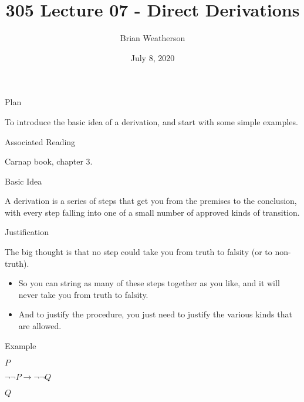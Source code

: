 \documentclass[
  ignorenonframetext,
]{beamer}
\title{305 Lecture 07 - Direct Derivations}
\author{Brian Weatherson}
\date{July 8, 2020}
\providecommand{\tightlist}{%
  \setlength{\itemsep}{0pt}\setlength{\parskip}{0pt}}
\renewcommand{\,}{\text{, }}
\renewenvironment*{quote}	
	{\list{}{\rightmargin   \leftmargin} \item } 	
	{\endlist }
\newcommand{\DisplayArg}[2]{
\begin{enumerate}
{#1}
\end{enumerate}
\vspace{-6pt}
\hrulefill

\begin{quote}
{\normalfont #2}
\end{quote}
\vspace{12pt}
}
\begin{document}
\frame{\titlepage}

\begin{frame}{Plan}
\protect\hypertarget{plan}{}

To introduce the basic idea of a derivation, and start with some simple
examples.

\end{frame}

\begin{frame}{Associated Reading}
\protect\hypertarget{associated-reading}{}

Carnap book, chapter 3.

\end{frame}

\begin{frame}{Basic Idea}
\protect\hypertarget{basic-idea}{}

A derivation is a series of steps that get you from the premises to the
conclusion, with every step falling into one of a small number of
approved kinds of transition.

\end{frame}

\begin{frame}{Justification}
\protect\hypertarget{justification}{}

The big thought is that no step could take you from truth to falsity (or
to non-truth).

\begin{itemize}
\tightlist
\item
  So you can string as many of these steps together as you like, and it
  will never take you from truth to falsity.
\item
  And to justify the procedure, you just need to justify the various
  kinds that are allowed.
\end{itemize}

\end{frame}

\begin{frame}{Example}
\protect\hypertarget{example}{}

\DisplayArg{ \item $P$ \item $\neg \neg P \rightarrow \neg \neg Q$ } { $Q$ }

\end{frame}
\end{document}
